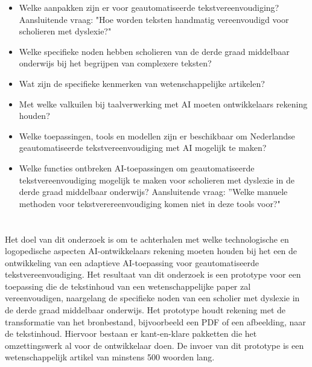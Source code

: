 \begin{itemize}
\item Welke aanpakken zijn er voor geautomatiseerde tekstvereenvoudiging? Aansluitende vraag: "Hoe worden teksten handmatig vereenvoudigd voor scholieren met dyslexie?"
\item Welke specifieke noden hebben scholieren van de derde graad middelbaar onderwijs bij het begrijpen van complexere teksten?
\item Wat zijn de specifieke kenmerken van wetenschappelijke artikelen?
\item Met welke valkuilen bij taalverwerking met AI moeten ontwikkelaars rekening houden?
\item Welke toepassingen, tools en modellen zijn er beschikbaar om Nederlandse geautomatiseerde tekstvereenvoudiging met AI mogelijk te maken?
\item Welke functies ontbreken AI-toepassingen om geautomatiseerde tekstvereenvoudiging mogelijk te maken voor scholieren met dyslexie in de derde graad middelbaar onderwijs? Aansluitende vraag: ”Welke manuele methoden voor tekstverereenvoudiging komen niet in deze tools voor?"
\end{itemize}


\section{}%
\label{sec:onderzoeksdoelstelling}


Het doel van dit onderzoek is om te achterhalen met welke technologische en logopedische aspecten AI-ontwikkelaars rekening moeten houden bij het een de ontwikkeling van een adaptieve AI-toepassing voor geautomatiseerde tekstvereenvoudiging. Het resultaat van dit onderzoek is een prototype voor een toepassing die de tekstinhoud van een wetenschappelijke paper zal vereenvoudigen, naargelang de specifieke noden van een scholier met dyslexie in de derde graad middelbaar onderwijs. Het prototype houdt rekening met de transformatie van het bronbestand, bijvoorbeeld een PDF of een afbeelding, naar de tekstinhoud. Hiervoor bestaan er kant-en-klare pakketten die het omzettingswerk al voor de ontwikkelaar doen. De invoer van dit prototype is een wetenschappelijk artikel van minstens 500 woorden lang.

